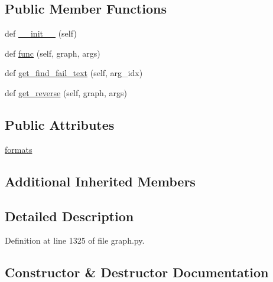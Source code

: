 \subsection*{Public Member Functions}
\begin{DoxyCompactItemize}
\item 
def \hyperlink{classlight__chats_1_1graph_1_1PutObjectInFunction_aaf12273d36c38e856cd7dd10bbb90c83}{\+\_\+\+\_\+init\+\_\+\+\_\+} (self)
\item 
def \hyperlink{classlight__chats_1_1graph_1_1PutObjectInFunction_a9f97c240b7308feca19fe4adb63a64f3}{func} (self, graph, args)
\item 
def \hyperlink{classlight__chats_1_1graph_1_1PutObjectInFunction_a634d7e2b36ebdc9b626e32811fabca00}{get\+\_\+find\+\_\+fail\+\_\+text} (self, arg\+\_\+idx)
\item 
def \hyperlink{classlight__chats_1_1graph_1_1PutObjectInFunction_a2e1c568fb874c53d06f12f0fc4349713}{get\+\_\+reverse} (self, graph, args)
\end{DoxyCompactItemize}
\subsection*{Public Attributes}
\begin{DoxyCompactItemize}
\item 
\hyperlink{classlight__chats_1_1graph_1_1PutObjectInFunction_ad244ff0f442d2c6b785022457e330040}{formats}
\end{DoxyCompactItemize}
\subsection*{Additional Inherited Members}


\subsection{Detailed Description}
\begin{DoxyVerb}
\end{DoxyVerb}
 

Definition at line 1325 of file graph.\+py.



\subsection{Constructor \& Destructor Documentation}
\mbox{\label{classlight__chats_1_1graph_1_1PutObjectInFunction_aaf12273d36c38e856cd7dd10bbb90c83}} 
